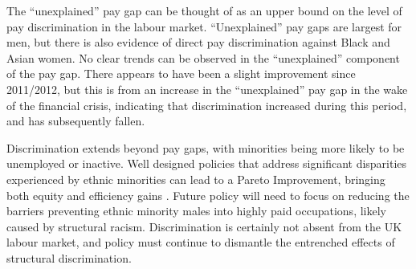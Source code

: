 \documentclass[class=article, crop=false]{standalone}
\begin{document}
The \enquote{unexplained} pay gap can be thought of as an upper bound on the level of pay discrimination in the labour market. \enquote{Unexplained} pay gaps are largest for men, but there is also evidence of direct pay discrimination against Black and Asian women. No clear trends can be observed in the \enquote{unexplained} component of the pay gap. There appears to have been a slight improvement since 2011/2012, but this is from an increase in the \enquote{unexplained} pay gap in the wake of the financial crisis, indicating that discrimination increased during this period, and has subsequently fallen.

Discrimination extends beyond pay gaps, with minorities being more likely to be unemployed or inactive. Well designed policies that address significant disparities experienced by ethnic minorities can lead to a Pareto Improvement, bringing both equity and efficiency gains \citep{LundbergB}. Future policy will need to focus on reducing the barriers preventing ethnic minority males into highly paid occupations, likely caused by structural racism. Discrimination is certainly not absent from the UK labour market, and policy must continue to dismantle the entrenched effects of structural discrimination. %

\ifstandalone

\fi
\end{document}
